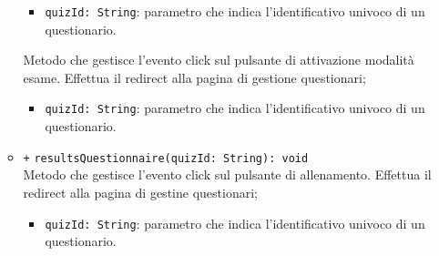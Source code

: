 \begin{itemize}
\begin{itemize}
		\begin{itemize}
			\item \texttt{quizId: String}: parametro che indica l'identificativo univoco di un questionario.
		\end{itemize}
		Metodo che gestisce l’evento click sul pulsante di attivazione modalità esame. Effettua il redirect alla pagina di gestione questionari;
		\begin{itemize}
			\item \texttt{quizId: String}: parametro che indica l'identificativo univoco di un questionario.
		\end{itemize}
		\item \texttt{+} \texttt{resultsQuestionnaire(quizId: String): void} \\
		Metodo che gestisce l’evento click sul pulsante di allenamento. Effettua il redirect alla pagina di gestine questionari;
		\begin{itemize}
			\item \texttt{quizId: String}: parametro che indica l'identificativo univoco di un questionario.
		\end{itemize}   
	\end{itemize}
\end{itemize}